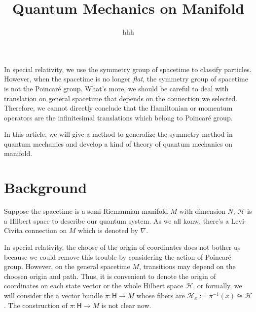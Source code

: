 \documentclass[12pt]{extarticle}
\title{Quantum Mechanics on Manifold}
\author{hhh}
\theoremstyle{definition}
\theoremstyle{plain}
\begin{document}
\maketitle

In special relativity, we use the symmetry group of spacetime to classify particles. However, when the spacetime is no longer \textit{flat}, the symmetry group of spacetime is not the Poincar\'e group. What's more, we should be careful to deal with translation on general spacetime that depends on the connection we selected. Therefore, we cannot directly conclude that the Hamiltonian or momentum operators are the infinitesimal translations which belong to Poincar\'e group.

In this article, we will give a method to generalize the symmetry method in quantum mechanics and develop a kind of theory of quantum mechanics on manifold.

\section{Background}

Suppose the spacetime is a semi-Riemannian manifold $M$ with dimension $N$, $\mathcal H$ is a Hilbert space to describe our quantum system. As we all konw, there's a Levi-Civita connection on $M$ which is denoted by $\nabla$.

In special relativity, the choose of the origin of coordinates does not bother us because we could remove this trouble by considering the action of Poincar\'e group. However, on the general spacetime $M$, transitions may depend on the choosen origin and path. Thus, it is convenient to denote  the origin of coordinates on each state vector or the whole Hilbert space $\mathcal H$, or formally, we will consider the a vector bundle $\pi:\mathsf H\to M$ whose fibers are $\mathcal H_x:=\pi^{-1}(x)\cong \mathcal H$. The construction of $\pi:\mathsf H\to M$ is not clear now.
\end{document}

